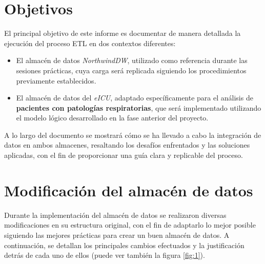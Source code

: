 \documentclass[12pt, a4paper, twoside]{article}
\begin{document}
	\section{Objetivos}
	
	El principal objetivo de este informe es documentar de manera detallada la ejecución del proceso ETL en dos contextos diferentes:
	
	\begin{itemize}
		\item El almacén de datos \textit{NorthwindDW}, utilizado como referencia durante las sesiones prácticas, cuya carga será replicada siguiendo los procedimientos previamente establecidos.
		\item El almacén de datos del \textit{eICU}, adaptado específicamente para el análisis de \textbf{pacientes con patologías respiratorias}, que será implementado utilizando el modelo lógico desarrollado en la fase anterior del proyecto.
	\end{itemize}
	
	A lo largo del documento se mostrará cómo se ha llevado a cabo la integración de datos en ambos almacenes, resaltando los desafíos enfrentados y las soluciones aplicadas, con el fin de proporcionar una guía clara y replicable del proceso.
	
	 
	
	\section{Modificación del almacén de datos}
	
	Durante la implementación del almacén de datos se realizaron diversas modificaciones en su estructura original, con el fin de adaptarlo lo mejor posible siguiendo las mejores prácticas para crear un buen almacén de datos. A continuación, se detallan los principales cambios efectuados y la justificación detrás de cada uno de ellos (puede ver también la figura \ref{fig:1}).
	
\end{document}
